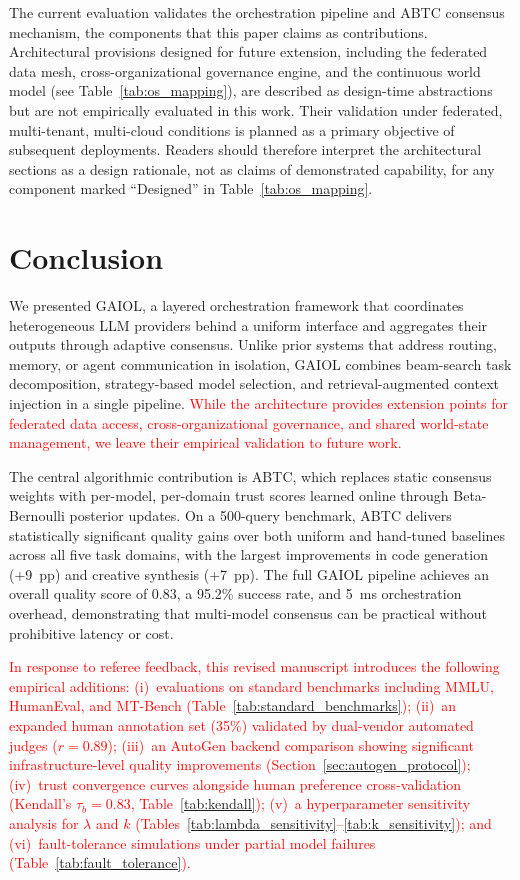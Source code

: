 \documentclass{iopjournal}
\newcommand{\rev}[1]{\textcolor{red}{#1}}
\begin{document}
The current evaluation validates the orchestration pipeline and ABTC consensus mechanism, the components that this paper claims as contributions. Architectural provisions designed for future extension, including the federated data mesh, cross-organizational governance engine, and the continuous world model (see Table~\ref{tab:os_mapping}), are described as design-time abstractions but are not empirically evaluated in this work. Their validation under federated, multi-tenant, multi-cloud conditions is planned as a primary objective of subsequent deployments. Readers should therefore interpret the architectural sections as a design rationale, not as claims of demonstrated capability, for any component marked ``Designed'' in Table~\ref{tab:os_mapping}.

\section{Conclusion}
\label{sec:conclusion}

We presented GAIOL, a layered orchestration framework that coordinates heterogeneous LLM providers behind a uniform interface and aggregates their outputs through adaptive consensus. Unlike prior systems that address routing, memory, or agent communication in isolation, GAIOL combines beam-search task decomposition, strategy-based model selection, and retrieval-augmented context injection in a single pipeline. \rev{While the architecture provides extension points for federated data access, cross-organizational governance, and shared world-state management, we leave their empirical validation to future work.}

The central algorithmic contribution is ABTC, which replaces static consensus weights with per-model, per-domain trust scores learned online through Beta-Bernoulli posterior updates. On a 500-query benchmark, ABTC delivers statistically significant quality gains over both uniform and hand-tuned baselines across all five task domains, with the largest improvements in code generation (+9~pp) and creative synthesis (+7~pp). The full GAIOL pipeline achieves an overall quality score of 0.83, a 95.2\% success rate, and 5~ms orchestration overhead, demonstrating that multi-model consensus can be practical without prohibitive latency or cost.

\rev{In response to referee feedback, this revised manuscript introduces the following empirical additions: (i)~evaluations on standard benchmarks including MMLU, HumanEval, and MT-Bench (Table~\ref{tab:standard_benchmarks}); (ii)~an expanded human annotation set (35\%) validated by dual-vendor automated judges ($r=0.89$); (iii)~an AutoGen backend comparison showing significant infrastructure-level quality improvements (Section~\ref{sec:autogen_protocol}); (iv)~trust convergence curves alongside human preference cross-validation (Kendall's $\tau_b = 0.83$, Table~\ref{tab:kendall}); (v)~a hyperparameter sensitivity analysis for $\lambda$ and $k$ (Tables~\ref{tab:lambda_sensitivity}--\ref{tab:k_sensitivity}); and (vi)~fault-tolerance simulations under partial model failures (Table~\ref{tab:fault_tolerance}).}
\end{document}
